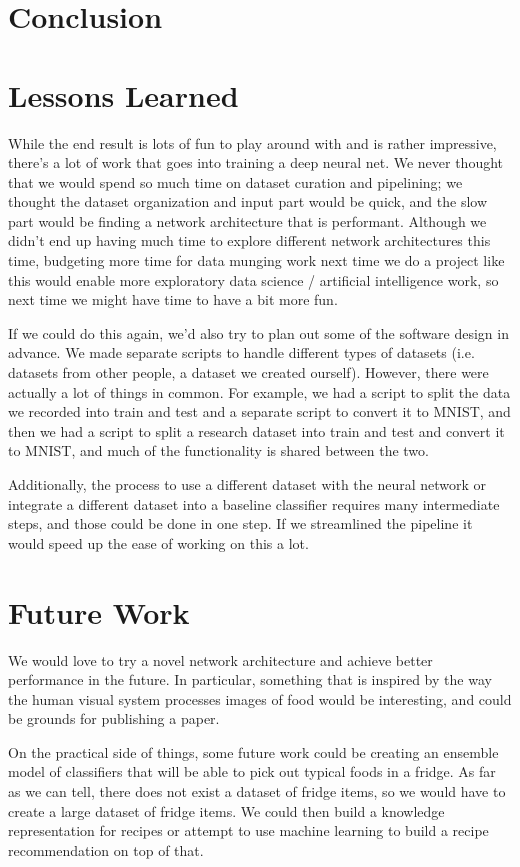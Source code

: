 \documentclass[leqno]{article}
\begin{document}
\section{Conclusion}

\section{Lessons Learned}
While the end result is lots of fun to play around with and is rather
impressive, there's a lot of work that goes into training a deep neural net. We never
thought that we would spend so much time on dataset curation and pipelining; we
thought the dataset organization and input part would be quick, and the slow
part would be finding a network architecture that is performant. Although we
didn't end up having much time to explore different network architectures this
time, budgeting more time for data munging work next time we do a project like
this would enable more exploratory data science / artificial intelligence work,
so next time we might have time to have a bit more fun.

If we could do this again, we'd also try to plan out some of the software design
in advance. We made separate scripts to handle different types of
datasets (i.e. datasets from other people, a dataset we created ourself).
However, there were actually a lot of things in common. For example, we had a
script to split the data we recorded into train and test and a separate script
to convert it to MNIST, and then we had a script to split a research dataset
into train and test and convert it to MNIST, and much of the functionality is
shared between the two.

Additionally, the process to use a different dataset with the neural network or 
integrate a different dataset into a baseline classifier
requires many intermediate steps, and those could be done in one step. If we
streamlined the pipeline it would speed up the ease of working on this a lot.

\section{Future Work}
We would love to try a novel network architecture and achieve better performance
in the future. In particular, something that is inspired by the way the human
visual system processes images of food would be interesting, and could be
grounds for publishing a paper.

On the practical side of things, some future work could be creating an ensemble
model of classifiers that will be able to pick out typical foods in a fridge.
As far as we can tell, there does not exist a dataset of fridge items, so we
would have to create a large dataset of fridge items. We could then build a
knowledge representation for recipes or attempt to use machine learning to build
a recipe recommendation on top of that.
\end{document}
